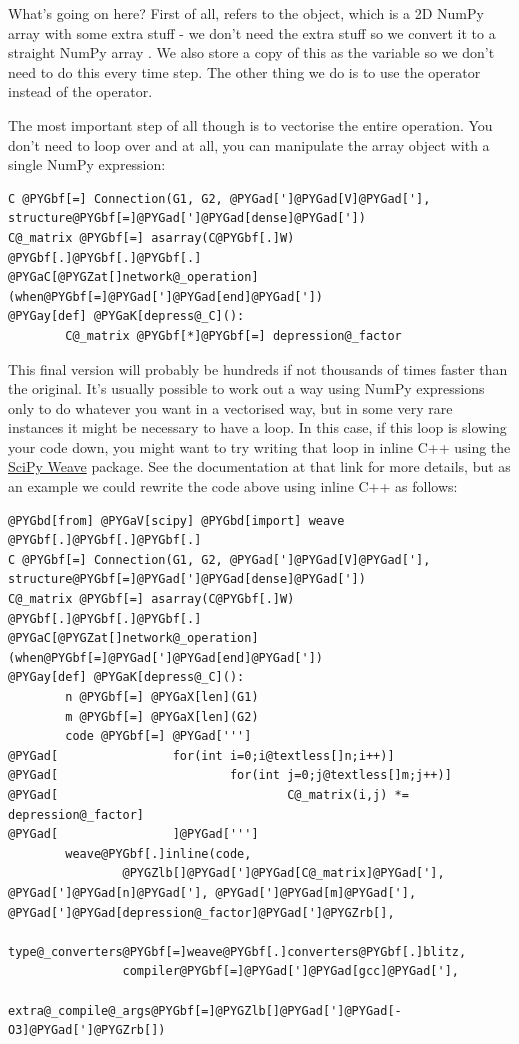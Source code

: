 \documentclass[letterpaper,10pt,english]{manual}
\begin{document}
What's going on here? First of all,  refers to the \hyperlink{brian.ConnectionMatrix}{}
object, which is a 2D NumPy array with some extra stuff - we don't need the extra
stuff so we convert it to a straight NumPy array . We also store
a copy of this as the variable  so we don't need to do this every
time step. The other thing we do is to use the \code{*=} operator instead of the \code{*}
operator.

The most important step of all though is to vectorise the entire operation. You
don't need to loop over  and  at all, you can manipulate the array
object with a single NumPy expression:

\begin{Verbatim}[commandchars=@\[\]]
C @PYGbf[=] Connection(G1, G2, @PYGad[']@PYGad[V]@PYGad['], structure@PYGbf[=]@PYGad[']@PYGad[dense]@PYGad['])
C@_matrix @PYGbf[=] asarray(C@PYGbf[.]W)
@PYGbf[.]@PYGbf[.]@PYGbf[.]
@PYGaC[@PYGZat[]network@_operation](when@PYGbf[=]@PYGad[']@PYGad[end]@PYGad['])
@PYGay[def] @PYGaK[depress@_C]():
        C@_matrix @PYGbf[*]@PYGbf[=] depression@_factor
\end{Verbatim}

This final version will probably be hundreds if not thousands of times faster
than the original. It's usually possible to work out a way using NumPy
expressions only to do whatever you want in a vectorised way, but in some
very rare instances it might be necessary to have a loop. In this case, if
this loop is slowing your code down, you might want to try writing that
loop in inline C++ using the \href{http://www.scipy.org/Weave}{SciPy Weave}
package. See the documentation at that link for more details, but as an
example we could rewrite the code above using inline C++ as follows:

\begin{Verbatim}[commandchars=@\[\]]
@PYGbd[from] @PYGaV[scipy] @PYGbd[import] weave
@PYGbf[.]@PYGbf[.]@PYGbf[.]
C @PYGbf[=] Connection(G1, G2, @PYGad[']@PYGad[V]@PYGad['], structure@PYGbf[=]@PYGad[']@PYGad[dense]@PYGad['])
C@_matrix @PYGbf[=] asarray(C@PYGbf[.]W)
@PYGbf[.]@PYGbf[.]@PYGbf[.]
@PYGaC[@PYGZat[]network@_operation](when@PYGbf[=]@PYGad[']@PYGad[end]@PYGad['])
@PYGay[def] @PYGaK[depress@_C]():
        n @PYGbf[=] @PYGaX[len](G1)
        m @PYGbf[=] @PYGaX[len](G2)
        code @PYGbf[=] @PYGad[''']
@PYGad[                for(int i=0;i@textless[]n;i++)]
@PYGad[                        for(int j=0;j@textless[]m;j++)]
@PYGad[                                C@_matrix(i,j) *= depression@_factor]
@PYGad[                ]@PYGad[''']
        weave@PYGbf[.]inline(code,
                @PYGZlb[]@PYGad[']@PYGad[C@_matrix]@PYGad['], @PYGad[']@PYGad[n]@PYGad['], @PYGad[']@PYGad[m]@PYGad['], @PYGad[']@PYGad[depression@_factor]@PYGad[']@PYGZrb[],
                type@_converters@PYGbf[=]weave@PYGbf[.]converters@PYGbf[.]blitz,
                compiler@PYGbf[=]@PYGad[']@PYGad[gcc]@PYGad['],
                extra@_compile@_args@PYGbf[=]@PYGZlb[]@PYGad[']@PYGad[-O3]@PYGad[']@PYGZrb[])
\end{Verbatim}
\end{document}
